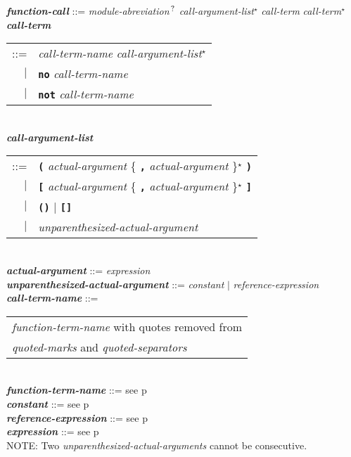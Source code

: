 \documentclass[12pt]{article}
\newcommand{\TT}[1]{{\tt \bfseries #1}}
\newcommand{\STAR}{{\Large $^\star$}}
\newcommand{\QMARK}{{$^{\,\mbox{\footnotesize ?}}$}}
\newcommand{\ttkey}[1]{{\tt \bfseries #1}}
\newcommand{\emkey}[1]{{\em \bfseries #1}}
\newcommand{\pagref}[1]{p\pageref{#1}}
\newenvironment{indpar}[1][0.3in]%
	{\begin{list}{}%
		     {\setlength{\itemsep}{0in}%
		      \setlength{\topsep}{0in}%
		      \setlength{\parsep}{1ex}%
		      \setlength{\labelwidth}{#1}%
		      \setlength{\leftmargin}{#1}%
		      \addtolength{\leftmargin}{\labelsep}}%
	 \item}%
	{\end{list}}
\begin{document}
\begin{indpar}
\emkey{function-call} ::= {\em module-abreviation}\QMARK{}
    	                  {\em call-argument-list}\STAR{}
                          {\em call-term} {\em call-term}\STAR{}
\\[0.5ex]
\emkey{call-term}
    \begin{tabular}[t]{rl}
    ::= & {\em call-term-name} {\em call-argument-list}\STAR{} \\
    $|$ & \ttkey{no} {\em call-term-name} \\
    $|$ & \ttkey{not} {\em call-term-name} \\
    \end{tabular}
\\[0.5ex]
\emkey{call-argument-list}
    \begin{tabular}[t]{rl}
    ::= & \TT{(} {\em actual-argument}
          \{ \TT{,} {\em actual-argument} \}\STAR{} \TT{)} \\
    $|$ & \TT{[} {\em actual-argument}
          \{ \TT{,} {\em actual-argument} \}\STAR{} \TT{]} \\
    $|$ & \TT{()} $|$ \TT{[]} \\
    $|$ & {\em unparenthesized-actual-argument} \\
    \end{tabular}
\\[0.5ex]
\emkey{actual-argument} ::= {\em expression}
\\[0.5ex]
\emkey{unparenthesized-actual-argument} ::=
    {\em constant} $|$ {\em reference-expression}
\\[0.5ex]
\emkey{call-term-name}\label{CALL-TERM-NAME} ::=
    \begin{tabular}[t]{@{}l}
    {\em function-term-name} with quotes removed from \\
    {\em quoted-marks} and {\em quoted-separators}
    \end{tabular}
\\[0.5ex]
\emkey{function-term-name} ::= see \pagref{FUNCTION-TERM-NAME}
\\[0.5ex]
\emkey{constant} ::= see \pagref{CONSTANTS}
\\[0.5ex]
\emkey{reference-expression} ::= see \pagref{REFERENCE-EXPRESSIONS}
\\[0.5ex]
\emkey{expression} ::= see \pagref{EXPRESSION}
\\[2.0ex]
NOTE: Two {\em unparenthesized-actual-arguments} cannot be consecutive.
\end{indpar}
\end{document}
